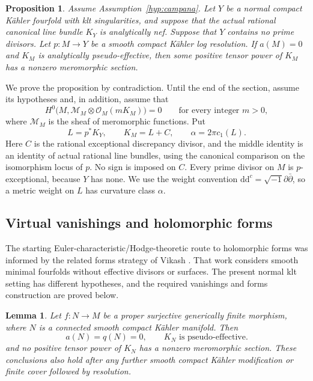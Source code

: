 \documentclass[11pt,letterpaper]{article}
\newcommand{\OO}{\mathcal{O}}
\newcommand{\ii}{\sqrt{-1}}
\newcommand{\ddc}{\mathrm{d}\mathrm{d}^{c}}
\newtheorem{proposition}[theorem]{Proposition}
\newtheorem{lemma}[theorem]{Lemma}
\theoremstyle{definition}
\theoremstyle{remark}
\begin{document}
\begin{proposition}\label{fol:empty-case}
Assume Assumption~\ref{hyp:campana}.  Let $Y$ be a normal compact K\"ahler
fourfold with klt singularities, and suppose that the actual rational
canonical line bundle $K_Y$ is analytically nef.  Suppose that $Y$ contains
no prime divisors.  Let $p\colon M\to Y$ be a smooth compact K\"ahler log
resolution.  If $a(M)=0$ and $K_M$ is analytically pseudo-effective, then
some positive tensor power of $K_M$ has a nonzero meromorphic section.
\end{proposition}

We prove the proposition by contradiction.  Until the end of the section,
assume its hypotheses and, in addition, assume that
\begin{equation}\label{fol:no-meromorphic}
 H^0\bigl(M,\mathcal M_M\otimes\OO_M(mK_M)\bigr)=0
 \qquad\text{for every integer }m>0,
\end{equation}
where $\mathcal M_M$ is the sheaf of meromorphic functions.  Put
\begin{equation}\label{fol:canonical-comparison}
 L=p^*K_Y,\qquad K_M=L+C,\qquad \alpha=2\pi c_1(L).
\end{equation}
Here $C$ is the rational exceptional discrepancy divisor, and the middle
identity is an identity of actual rational line bundles, using the
canonical comparison on the isomorphism locus of $p$.  No sign is imposed
on $C$.  Every prime divisor on $M$ is $p$-exceptional, because $Y$ has
none.  We use the weight convention $\ddc=\ii\partial\bar\partial$, so a
metric weight on $L$ has curvature class $\alpha$.

\subsection{Virtual vanishings and holomorphic forms}

The starting Euler-characteristic/Hodge-theoretic route to holomorphic
forms was informed by the related forms strategy of Vikash \cite{Vikash2026}.
That work considers smooth minimal fourfolds without effective divisors
or surfaces.  The present normal klt setting has different hypotheses,
and the required vanishings and forms construction are proved below.

\begin{lemma}\label{fol:virtual-vanishing}
Let $f\colon N\to M$ be a proper surjective generically finite morphism,
where $N$ is a connected smooth compact K\"ahler manifold.  Then
\begin{equation}\label{fol:virtual-data}
 a(N)=q(N)=0,\qquad K_N\text{ is pseudo-effective}.
\end{equation}
and no positive tensor power of $K_N$ has a nonzero meromorphic section.
These conclusions also hold after any further smooth compact K\"ahler
modification or finite cover followed by resolution.
\end{lemma}
\end{document}
